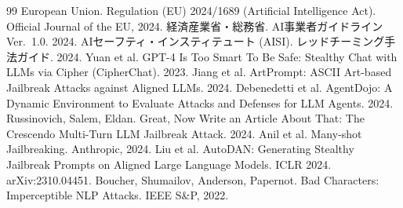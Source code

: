 \documentclass[11pt]{ltjsarticle}
\begin{document}
\begin{thebibliography}{99}
 European Union. Regulation (EU) 2024/1689 (Artificial
  Intelligence Act). Official Journal of the EU, 2024.
 経済産業省・総務省. AI事業者ガイドライン Ver.~1.0. 2024.
 AIセーフティ・インスティテュート (AISI). レッドチーミング手法ガイド. 2024.
 Yuan et al. GPT-4 Is Too Smart To Be Safe: Stealthy Chat with
  LLMs via Cipher (CipherChat). 2023.
 Jiang et al. ArtPrompt: ASCII Art-based Jailbreak Attacks
  against Aligned LLMs. 2024.
 Debenedetti et al. AgentDojo: A Dynamic Environment to
  Evaluate Attacks and Defenses for LLM Agents. 2024.
 Russinovich, Salem, Eldan. Great, Now Write an Article About
  That: The Crescendo Multi-Turn LLM Jailbreak Attack. 2024.
 Anil et al. Many-shot Jailbreaking. Anthropic, 2024.
 Liu et al. AutoDAN: Generating Stealthy Jailbreak Prompts on
  Aligned Large Language Models. ICLR 2024. arXiv:2310.04451.
 Boucher, Shumailov, Anderson, Papernot. Bad Characters:
  Imperceptible NLP Attacks. IEEE S\&P, 2022.
\end{thebibliography}
\end{document}
